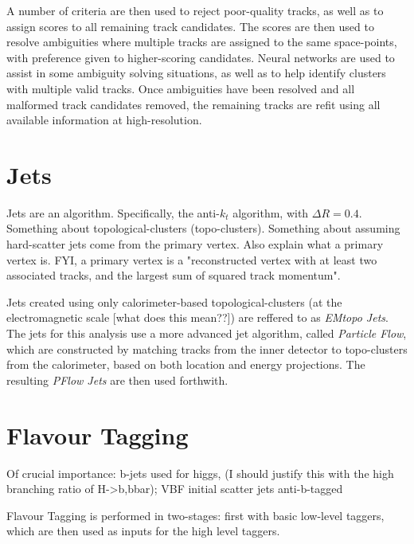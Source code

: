         A number of criteria are then used to reject poor-quality tracks, as well as to assign scores to all remaining track candidates.
        The scores are then used to resolve ambiguities where multiple tracks are assigned to the same space-points,
            with preference given to higher-scoring candidates.
        Neural networks are used to assist in some ambiguity solving situations,
            as well as to help identify clusters with multiple valid tracks.
        Once ambiguities have been resolved and all malformed track candidates removed,
            the remaining tracks are refit using all available information at high-resolution.
        \cite{atlas_track_reco_performance}

    \section{Jets}
        Jets are an algorithm.
        Specifically, the anti-$k_t$ algorithm, with $\Delta R = 0.4$.
        Something about topological-clusters (topo-clusters).
        \cite{anti_kt}
        Something about assuming hard-scatter jets come from the primary vertex.
        Also explain what a primary vertex is.
        FYI, a primary vertex is a "reconstructed vertex with at least two associated tracks, and the largest sum of squared track momentum".

        Jets created using only calorimeter-based topological-clusters (at the electromagnetic scale [what does this mean??]) %
            are reffered to as \textit{EMtopo Jets}.
        The jets for this analysis use a more advanced jet algorithm, called \textit{Particle Flow},
            which are constructed by matching tracks from the inner detector to topo-clusters from the calorimeter,
            based on both location and energy projections.
        The resulting \textit{PFlow Jets} are then used forthwith.
        \cite{pflow}
        \cite{jet_energy_scale13TeV}

    \section{Flavour Tagging}
        Of crucial importance:
            b-jets used for higgs, (I should justify this with the high branching ratio of H->b,bbar);
            VBF initial scatter jets anti-b-tagged

        Flavour Tagging is performed in two-stages:
            first with basic low-level taggers,
            which are then used as inputs for the high level taggers.

